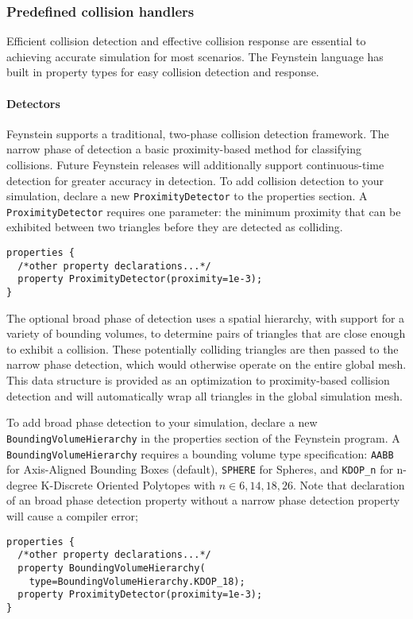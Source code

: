 \documentclass[letterpaper]{article}
\newcommand\subsubsubsection[1]{\paragraph{#1}}
\begin{document}
\subsubsection{Predefined collision handlers}
Efficient collision detection and effective collision response are
essential to achieving accurate simulation for most scenarios. The
Feynstein language has built in property types for easy collision
detection and response.

\subsubsubsection{Detectors}

Feynstein supports a traditional, two-phase collision detection
framework. The narrow phase of detection a basic proximity-based
method for classifying collisions. Future Feynstein releases will
additionally support continuous-time detection for greater accuracy in
detection. To add collision detection to your simulation, declare a
new \texttt{ProximityDetector} to the properties section. A \texttt{ProximityDetector}
requires one parameter: the minimum proximity that can be exhibited
between two triangles before they are detected as colliding.

\begin{verbatim}
properties {
  /*other property declarations...*/
  property ProximityDetector(proximity=1e-3);
}
\end{verbatim}

The optional broad phase of detection uses a spatial hierarchy, with
support for a variety of bounding volumes, to determine pairs of
triangles that are close enough to exhibit a collision. These
potentially colliding triangles are then passed to the narrow phase
detection, which would otherwise operate on the entire global
mesh. This data structure is provided as an optimization to
proximity-based collision detection and will automatically wrap all
triangles in the global simulation mesh.

To add broad phase detection to your simulation, declare a new
\texttt{Bounding\-Volume\-Hierarchy} in the properties section of the Feynstein
program. A \texttt{Bounding\-Volume\-Hierarchy} requires a bounding volume type
specification: \texttt{AABB} for Axis-Aligned Bounding Boxes (default),
\texttt{SPHERE} for Spheres, and \texttt{KDOP\_n} for n-degree K-Discrete Oriented
Polytopes with $n \in {6, 14, 18, 26}$. Note that declaration of an
broad phase detection property without a narrow phase detection
property will cause a compiler error;

\begin{verbatim}
properties {
  /*other property declarations...*/
  property BoundingVolumeHierarchy(
    type=BoundingVolumeHierarchy.KDOP_18);
  property ProximityDetector(proximity=1e-3);
}
\end{verbatim}
\end{document}
